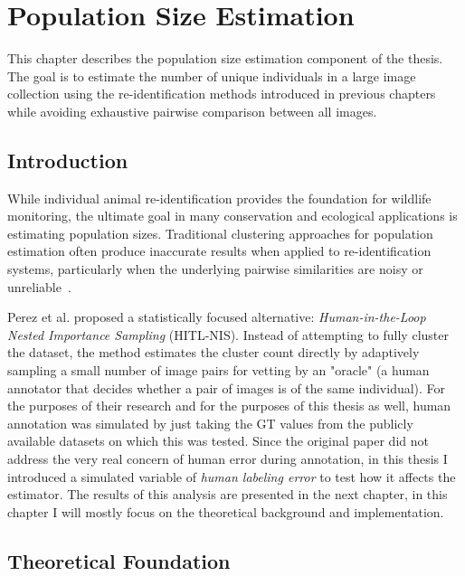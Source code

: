 \chapter{Population Size Estimation}
\label{chap:population_size}

This chapter describes the population size estimation component of the thesis. The goal is to estimate the number of unique individuals in a large image collection using the re-identification methods introduced in previous chapters while avoiding exhaustive pairwise comparison between all images.

\section{Introduction}

While individual animal re-identification provides the foundation for wildlife monitoring, the ultimate goal in many conservation and ecological applications is estimating population sizes. Traditional clustering approaches for population estimation often produce inaccurate results when applied to re-identification systems, particularly when the underlying pairwise similarities are noisy or unreliable~\cite{perez2024humanintheloopvisualreidpopulation}.

Perez et al.\cite{perez2024humanintheloopvisualreidpopulation} proposed a statistically focused alternative: \emph{Human-in-the-Loop Nested Importance Sampling} (HITL-NIS). Instead of attempting to fully cluster the dataset, the method estimates the cluster count directly by adaptively sampling a small number of image pairs for vetting by an "oracle" (a human annotator that decides whether a pair of images is of the same individual). For the purposes of their research and for the purposes of this thesis as well, human annotation was simulated by just taking the GT values from the publicly available datasets on which this was tested. Since the original paper did not address the very real concern of human error during annotation, in this thesis I introduced a simulated variable of \emph{human labeling error} to test how it affects the estimator. The results of this analysis are presented in the next chapter, in this chapter I will mostly focus on the theoretical background and implementation. 

\section{Theoretical Foundation}
\label{sec:theoretical_foundation}

